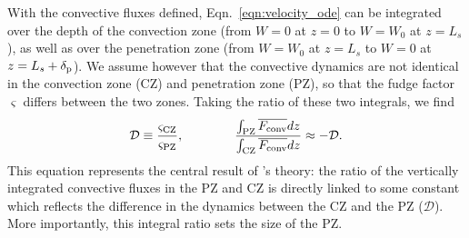 \documentclass{aastex631}
\newcommand{\delp}{\ensuremath{\delta_{\rm{p}}}}
\newcommand{\Fconv}{\ensuremath{F_{\rm{conv}}}}
\newcommand{\mD}{\ensuremath{\mathcal{D}}}
\begin{document}
With the convective fluxes defined, Eqn.~\ref{eqn:velocity_ode} can be integrated over the depth of the convection zone (from $W = 0$ at $z = 0$ to $W = W_0$ at $z = L_s$), as well as over the penetration zone (from $W = W_0$ at $z = L_s$ to $W = 0$ at $z = L_s + \delp$).
We assume however that the convective dynamics are not identical in the convection zone (CZ) and penetration zone (PZ), so that the fudge factor $\varsigma$ differs between the two zones.
Taking the ratio of these two integrals, we find
\begin{equation}
\mD \equiv \frac{\varsigma_{\rm{CZ}}}{\varsigma_{\rm{PZ}}},\qquad\qquad
\frac{\int_{\rm{PZ}} \overline{\Fconv} dz}{\int_{\rm{CZ}} \overline{\Fconv} dz} \approx - \mD.
\label{eqn:theory_fraction}
\end{equation}
This equation represents the central result of \citet{zahn1991}'s theory: the ratio of the vertically integrated convective fluxes in the PZ and CZ is directly linked to some constant which reflects the difference in the dynamics between the CZ and the PZ ($\mD$).
More importantly, this integral ratio sets the size of the PZ.
\end{document}
